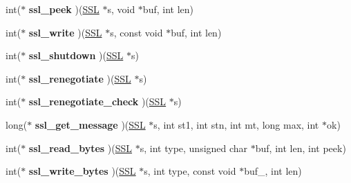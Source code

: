 \begin{DoxyCompactItemize}
\item 
\hypertarget{structssl__method__st_a4216ad37e9a089392b0fe1915ed745d7}{}int($\ast$ {\bfseries ssl\+\_\+peek} )(\hyperlink{structssl__st}{S\+S\+L} $\ast$s, void $\ast$buf, int len)\label{structssl__method__st_a4216ad37e9a089392b0fe1915ed745d7}

\item 
\hypertarget{structssl__method__st_aeaa1745bfd8cea08b5d943fa49c1804a}{}int($\ast$ {\bfseries ssl\+\_\+write} )(\hyperlink{structssl__st}{S\+S\+L} $\ast$s, const void $\ast$buf, int len)\label{structssl__method__st_aeaa1745bfd8cea08b5d943fa49c1804a}

\item 
\hypertarget{structssl__method__st_a7dc97d1a59c10baa705a23e5aa4f7546}{}int($\ast$ {\bfseries ssl\+\_\+shutdown} )(\hyperlink{structssl__st}{S\+S\+L} $\ast$s)\label{structssl__method__st_a7dc97d1a59c10baa705a23e5aa4f7546}

\item 
\hypertarget{structssl__method__st_a68ba7cb568d9c9c3e2bd15020a30beb0}{}int($\ast$ {\bfseries ssl\+\_\+renegotiate} )(\hyperlink{structssl__st}{S\+S\+L} $\ast$s)\label{structssl__method__st_a68ba7cb568d9c9c3e2bd15020a30beb0}

\item 
\hypertarget{structssl__method__st_a07e92db03c1a7907ed8346916c038215}{}int($\ast$ {\bfseries ssl\+\_\+renegotiate\+\_\+check} )(\hyperlink{structssl__st}{S\+S\+L} $\ast$s)\label{structssl__method__st_a07e92db03c1a7907ed8346916c038215}

\item 
\hypertarget{structssl__method__st_a128347c6e6007078bc17af9c64b566f3}{}long($\ast$ {\bfseries ssl\+\_\+get\+\_\+message} )(\hyperlink{structssl__st}{S\+S\+L} $\ast$s, int st1, int stn, int mt, long max, int $\ast$ok)\label{structssl__method__st_a128347c6e6007078bc17af9c64b566f3}

\item 
\hypertarget{structssl__method__st_a9f992bd27f8e79cf166c9783bdc29932}{}int($\ast$ {\bfseries ssl\+\_\+read\+\_\+bytes} )(\hyperlink{structssl__st}{S\+S\+L} $\ast$s, int type, unsigned char $\ast$buf, int len, int peek)\label{structssl__method__st_a9f992bd27f8e79cf166c9783bdc29932}

\item 
\hypertarget{structssl__method__st_a20933c416539a546d3749a725e0602e7}{}int($\ast$ {\bfseries ssl\+\_\+write\+\_\+bytes} )(\hyperlink{structssl__st}{S\+S\+L} $\ast$s, int type, const void $\ast$buf\+\_\+, int len)\label{structssl__method__st_a20933c416539a546d3749a725e0602e7}


\end{DoxyCompactItemize}
